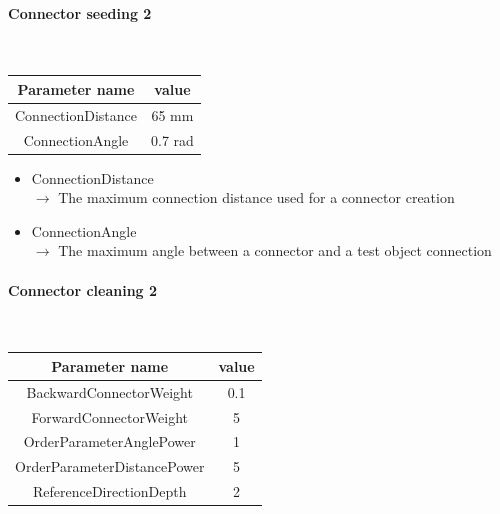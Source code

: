 \documentclass[cits]{JINST}
\begin{document}
\paragraph{Connector seeding 2} ~

\begin{table}[!ht]
  \begin{center}
    \begin{tabu} to \linewidth { c | c } 
          Parameter name & value \\
          \hline
          ConnectionDistance & 65 mm \\
          ConnectionAngle & 0.7 rad
    \end{tabu} 
  \end{center}
\end{table}

\begin{itemize}
  \item ConnectionDistance \\
  $\rightarrow$ The maximum connection distance used for a connector creation
  \item ConnectionAngle \\
  $\rightarrow$ The maximum angle between a connector and a test object connection
\end{itemize}


\newpage
\paragraph{Connector cleaning 2} ~

\begin{table}[!ht]
  \begin{center}
    \begin{tabu} to \linewidth { c | c } 
          Parameter name & value \\
          \hline
          BackwardConnectorWeight & 0.1 \\
          ForwardConnectorWeight & 5 \\
          OrderParameterAnglePower & 1 \\
          OrderParameterDistancePower & 5 \\
          ReferenceDirectionDepth & 2
    \end{tabu} 
  \end{center}
\end{table}
\end{document}
